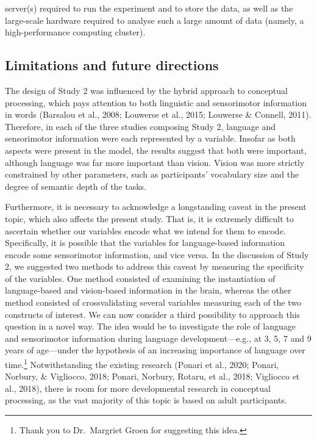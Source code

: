 \documentclass[
  12pt,
  man,floatsintext]{apa7}
\begin{document}
server(s) required to run the experiment and to store the data, as well as the large-scale hardware required to analyse such a large amount of data (namely, a high-performance computing cluster).

\hypertarget{limitations-and-future-directions}{%
\subsection{Limitations and future directions}\label{limitations-and-future-directions}}

The design of Study 2 was influenced by the hybrid approach to conceptual processing, which pays attention to both linguistic and sensorimotor information in words (Barsalou et al., 2008; Louwerse et al., 2015; Louwerse \& Connell, 2011). Therefore, in each of the three studies composing Study 2, language and sensorimotor information were each represented by a variable. Insofar as both aspects were present in the model, the results suggest that both were important, although language was far more important than vision. Vision was more strictly constrained by other parameters, such as participants' vocabulary size and the degree of semantic depth of the tasks.

Furthermore, it is necessary to acknowledge a longstanding caveat in the present topic, which also affects the present study. That is, it is extremely difficult to ascertain whether our variables encode what we intend for them to encode. Specifically, it is possible that the variables for language-based information encode some sensorimotor information, and vice versa. In the discussion of Study 2, we suggested two methods to address this caveat by measuring the specificity of the variables. One method consisted of examining the instantiation of language-based and vision-based information in the brain, whereas the other method consisted of crossvalidating several variables measuring each of the two constructs of interest. We can now consider a third possibility to approach this question in a novel way. The idea would be to investigate the role of language and sensorimotor information during language development---e.g., at 3, 5, 7 and 9 years of age---under the hypothesis of an increasing importance of language over time.\footnote{Thank you to Dr.~Margriet Groen for suggesting this idea.} Notwithstanding the existing research (Ponari et al., 2020; Ponari, Norbury, \& Vigliocco, 2018; Ponari, Norbury, Rotaru, et al., 2018; Vigliocco et al., 2018), there is room for more developmental research in conceptual processing, as the vast majority of this topic is based on adult participants.
\end{document}
